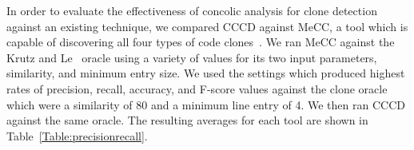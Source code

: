 \documentclass{sig-alternate}
\begin{document}




In order to evaluate the effectiveness of concolic analysis for clone detection against an existing technique, we compared CCCD against MeCC, a tool which is capable of discovering all four types of code clones~\cite{Kim:2011:MMC:1985793.1985835}. We ran MeCC against the Krutz and Le~\cite{Krutz:2014:CCO:2597073.2597127} oracle using a variety of values for its two input parameters, similarity, and minimum entry size. We used the settings which produced highest rates of precision, recall, accuracy, and F-score values against the clone oracle which were a similarity of 80 and a minimum line entry of 4. We then ran CCCD against the same oracle. The resulting averages for each tool are shown in Table~\ref{Table:precisionrecall}.







\end{document}
